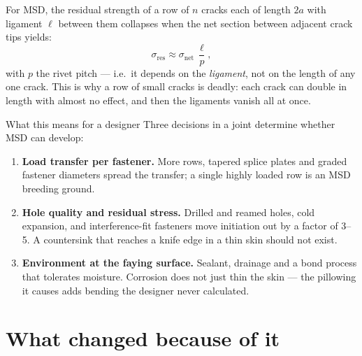 \documentclass[11pt,a4paper]{article}
\begin{document}
For MSD, the residual strength of a row of $n$ cracks each of length $2a$ with ligament $\ell$ between them collapses when the net section between adjacent crack tips yields:
\[
\sigma_{\text{res}} \approx \sigma_{\text{net}}\,\frac{\ell}{p},
\]
with $p$ the rivet pitch --- i.e.\ it depends on the \emph{ligament}, not on the length of any one crack. This is why a row of small cracks is deadly: each crack can double in length with almost no effect, and then the ligaments vanish all at once.

\begin{aerobox}{What this means for a designer}
Three decisions in a joint determine whether MSD can develop:
\begin{enumerate}[nosep]
  \item \textbf{Load transfer per fastener.} More rows, tapered splice plates and graded fastener diameters spread the transfer; a single highly loaded row is an MSD breeding ground.
  \item \textbf{Hole quality and residual stress.} Drilled and reamed holes, cold expansion, and interference-fit fasteners move initiation out by a factor of 3--5. A countersink that reaches a knife edge in a thin skin should not exist.
  \item \textbf{Environment at the faying surface.} Sealant, drainage and a bond process that tolerates moisture. Corrosion does not just thin the skin --- the pillowing it causes adds bending the designer never calculated.
\end{enumerate}
\end{aerobox}

\section{What changed because of it}
\end{document}
